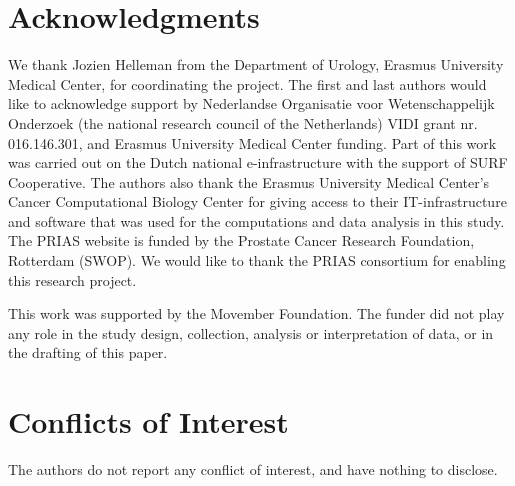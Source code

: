 \section*{Acknowledgments}
We thank Jozien Helleman from the Department of Urology, Erasmus University Medical Center, for coordinating the project. The first and last authors would like to acknowledge support by Nederlandse Organisatie voor Wetenschappelijk Onderzoek (the national research council of the Netherlands) VIDI grant nr. 016.146.301, and Erasmus University Medical Center funding. Part of this work was carried out on the Dutch national e-infrastructure with the support of SURF Cooperative. The authors also thank the Erasmus University Medical Center's Cancer Computational Biology Center for giving access to their IT-infrastructure and software that was used for the computations and data analysis in this study. The PRIAS website is funded by the Prostate Cancer Research Foundation, Rotterdam (SWOP). We would like to thank the PRIAS consortium for enabling this research project. 

This work was supported by the Movember Foundation. The funder did not play any role in the study design, collection, analysis or interpretation of data, or in the drafting of this paper. 

\section*{Conflicts of Interest}
The authors do not report any conflict of interest, and have nothing to disclose.